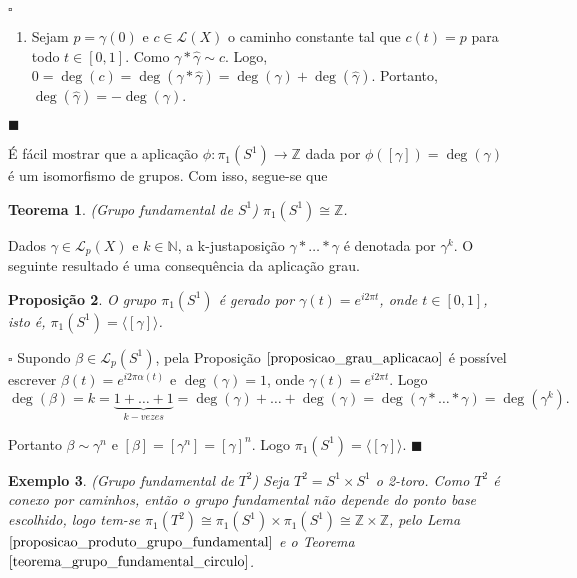 \documentclass[12pt]{book}
\newtheorem{teorema}{Teorema}[section]
\newtheorem{exemplo}[teorema]{Exemplo}
\newtheorem{proposicao}[teorema]{Proposição}
\newenvironment{prova}[1]{$\square$ #1}{\hfill$\blacksquare$}
\newcommand{\caminhos}{\mathcal{L}}
\newcommand{\caminhossempontobase}[1]{\caminhos(#1)}
\newcommand{\caminhospontobasegeral}[2]{\caminhos_{#1}(#2)}
\newcommand{\circulo}{S^{1}}
\newcommand{\classe}[1]{[#1]}
\newcommand{\gerador}[1]{\langle #1\rangle}
\newcommand{\grupofundamental}[1]{\pi_{1}(#1)}
\newcommand{\inteiros}{\mathbb{Z}}
\newcommand{\intervalo}{[0,1]}
\begin{document}
\begin{prova}
\begin{enumerate}
			\item Sejam $p=\gamma(0)$ e $c\in \caminhossempontobase{X}$ o caminho constante tal que $c(t)=p$ para todo $t\in \intervalo$. Como $\gamma*\hat{\gamma}  \sim c$. Logo, $0=\deg(c) = \deg(\gamma*\hat{\gamma} ) = \deg(\gamma) + \deg(\hat{\gamma} )$. Portanto, $\deg(\hat{\gamma} ) = -\deg(\gamma) $.
		\end{enumerate}
	\end{prova}
	
	É fácil mostrar que a aplicação $\phi:\grupofundamental{\circulo}\to  \inteiros$ dada por $\phi (\classe{\gamma})=\deg(\gamma)$ é um isomorfismo de grupos. Com isso, segue-se que
	
	\begin{teorema}\label{teorema_grupo_fundamental_circulo}
		(Grupo fundamental de $\circulo$) $\grupofundamental{\circulo} \cong \inteiros$.
	\end{teorema}
	
	Dados $\gamma \in \caminhospontobasegeral{p}{X}$ e $k \in \mathbb{N}$, a k-justaposição $\gamma*\dots * \gamma$ é denotada por $\gamma^{k}$. O seguinte resultado é uma consequência da aplicação grau.
	
	\begin{proposicao}\label{proposicao_gerador_grupo_fundamental_ciruclo}
		O grupo $\grupofundamental{\circulo}$ é gerado por $\gamma(t) = e^{i2\pi t}$, onde $t \in [0,1]$, isto é, $\grupofundamental{\circulo} = \gerador{\classe{\gamma}} $.
	\end{proposicao}
	\begin{prova}
		Supondo $\beta \in \caminhospontobasegeral{p}{\circulo}$, pela Proposição $\ref{proposicao_grau_aplicacao}$ é possível escrever $\beta(t)=e^{i2\pi \alpha(t)}$ e $\deg(\gamma) = 1$, onde $\gamma(t)= e^{i2\pi t}$. Logo
		$$
		\deg(\beta) = k = \underbrace{1+\dots+1}_{k-vezes} = \deg(\gamma)+\dots+\deg(\gamma) = \deg(\gamma *\dots *\gamma) = \deg(\gamma^{k}).
		$$
		
		Portanto $\beta \sim \gamma^{n}$ e $\classe{\beta} = \classe{\gamma^{n}}=\classe{\gamma}^{n}$. Logo $\grupofundamental{\circulo} = \gerador{\classe{\gamma}}$.
	\end{prova}
	
	\begin{exemplo}
		(Grupo fundamental de $T^{2}$) Seja $T^{2}=\circulo \times \circulo$ o 2-toro. Como $T^{2}$ é conexo por caminhos, então o grupo fundamental não depende do ponto base escolhido, logo tem-se $\grupofundamental{T^{2}} \cong \grupofundamental{\circulo} \times \grupofundamental{\circulo} \cong \inteiros \times \inteiros$, pelo Lema $\ref{proposicao_produto_grupo_fundamental}$ e o Teorema $\ref{teorema_grupo_fundamental_circulo}$. 
	\end{exemplo}
	
\end{document}
